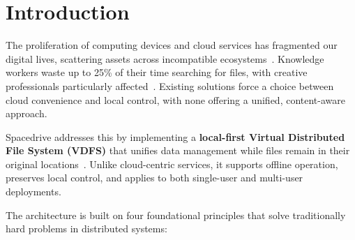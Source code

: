 \documentclass[sigconf]{acmart}
\begin{document}


\maketitle

\section{Introduction}

The proliferation of computing devices and cloud services has fragmented our digital lives, scattering assets across incompatible ecosystems~\cite{bergman_fragmentation_2006, atlassian2025}. Knowledge workers waste up to 25\% of their time searching for files, with creative professionals particularly affected~\cite{atlassian2025}. Existing solutions force a choice between cloud convenience and local control, with none offering a unified, content-aware approach.

Spacedrive addresses this by implementing a \textbf{local-first Virtual Distributed File System (VDFS)} that unifies data management while files remain in their original locations~\cite{kleppmann_localfirst_2019}. Unlike cloud-centric services, it supports offline operation, preserves local control, and applies to both single-user and multi-user deployments.

The architecture is built on four foundational principles that solve traditionally hard problems in distributed systems:
\end{document}
